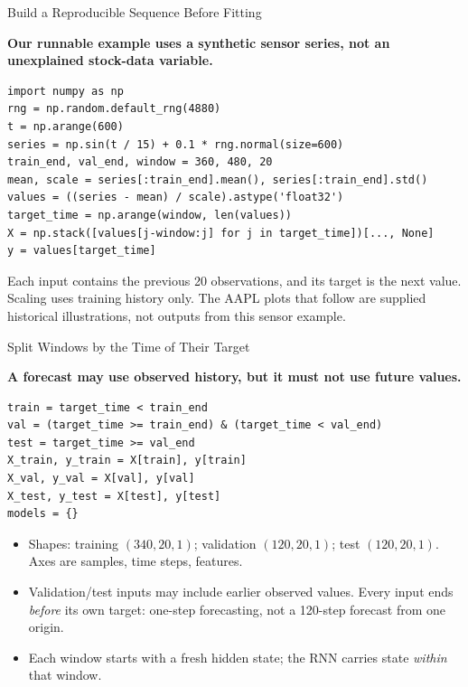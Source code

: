 \documentclass[aspectratio=169,10pt]{beamer}
\newcommand{\conceptlead}[1]{{\small\bfseries\color{CalPolyGreen}#1\par}}
\begin{document}
\begin{frame}[fragile]{Build a Reproducible Sequence Before Fitting}
\small
\conceptlead{Our runnable example uses a synthetic sensor series, not an unexplained stock-data variable.}
{\footnotesize\begin{verbatim}
import numpy as np
rng = np.random.default_rng(4880)
t = np.arange(600)
series = np.sin(t / 15) + 0.1 * rng.normal(size=600)
train_end, val_end, window = 360, 480, 20
mean, scale = series[:train_end].mean(), series[:train_end].std()
values = ((series - mean) / scale).astype('float32')
target_time = np.arange(window, len(values))
X = np.stack([values[j-window:j] for j in target_time])[..., None]
y = values[target_time]
\end{verbatim}}
\begin{keyidea}Each input contains the previous 20 observations, and its target is the next value. Scaling uses training history only. The AAPL plots that follow are supplied historical illustrations, not outputs from this sensor example.\end{keyidea}
\end{frame}

\begin{frame}[fragile]{Split Windows by the Time of Their Target}
\small
\conceptlead{A forecast may use observed history, but it must not use future values.}
{\footnotesize\begin{verbatim}
train = target_time < train_end
val = (target_time >= train_end) & (target_time < val_end)
test = target_time >= val_end
X_train, y_train = X[train], y[train]
X_val, y_val = X[val], y[val]
X_test, y_test = X[test], y[test]
models = {}
\end{verbatim}}
\begin{itemize}
 \item Shapes: training $(340,20,1)$; validation $(120,20,1)$; test $(120,20,1)$. Axes are samples, time steps, features.
 \item Validation/test inputs may include earlier observed values. Every input ends \emph{before} its own target: one-step forecasting, not a 120-step forecast from one origin.
 \item Each window starts with a fresh hidden state; the RNN carries state \emph{within} that window.
\end{itemize}
\end{frame}
\end{document}
